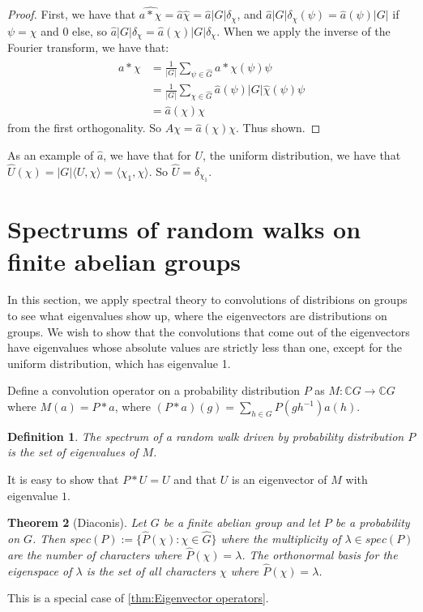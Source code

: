\documentclass[]{article}
\newtheorem{theorem}{Theorem}
\newtheorem{definition}[theorem]{Definition}
\theoremstyle{definition}
\numberwithin{theorem}{section}
\numberwithin{equation}{section}
\begin{document}
\begin{proof}
	First, we have that $\widehat{a\ast \chi} = \widehat{a} \widehat{\chi} = \widehat{a} |G| \delta_\chi$, and $\widehat{a} |G| \delta_\chi(\psi) = \widehat{a}(\psi) |G|$ if $\psi = \chi$ and 0 else, so $\widehat{a} |G| \delta_\chi = \widehat{a}(\chi) |G| \delta_\chi$. When we apply the inverse of the Fourier transform, we have that:
	\begin{align*}
		a \ast \chi &= \frac{1}{|G|}\sum_{\psi \in \widehat{G}} \widehat{a \ast \chi}(\psi) \psi\\
		&=
		\frac{1}{|G|}\sum_{\chi \in \widehat{G}} \widehat{a}(\psi) |G| \widehat{\chi}(\psi) \psi\\
		&= \widehat{a}(\chi) \chi
	\end{align*}
	from the first orthogonality. So $A \chi = \widehat{a}(\chi) \chi$. Thus shown. 
\end{proof}

As an example of $\widehat{a}$, we have that for $U$, the uniform distribution, we have that $\widehat{U}(\chi) = |G|\langle U, \chi \rangle = \langle \chi_1, \chi \rangle $. So $\widehat{U} = \delta_{\chi_1}$. 

\section{Spectrums of random walks on finite abelian groups}\label{sec:spectral theory}
In this section, we apply spectral theory to convolutions of distribions on groups to see what eigenvalues show up, where the eigenvectors are distributions on groups. We wish to show that the convolutions that come out of the eigenvectors have eigenvalues whose absolute values are strictly less than one, except for the uniform distribution, which has eigenvalue 1.

Define a convolution operator on a probability distribution $P$ as $M : \mathbb{C}G \rightarrow \mathbb{C}G$ where $M(a) = P \ast a$, where $(P \ast a) (g) =\sum_{h\in G} P(gh^{-1})a(h)$.
\begin{definition}
	The spectrum of a random walk driven by probability distribution $P$ is the set of eigenvalues of $M$. 
\end{definition} 
It is easy to show that $P \ast U = U$ and that $U$ is an eigenvector of $M$ with eigenvalue $1$. 


\begin{theorem}[Diaconis]
	\label{thm:Diaconis}
	Let $G$ be a finite abelian group and let $P$ be a probability on $G$. Then $spec(P) := \lbrace \widehat{P}(\chi) : \chi \in \widehat{G} \rbrace$ where the multiplicity of $\lambda \in spec(P)$ are the number of characters where $\widehat{P}(\chi) = \lambda$. The orthonormal basis for the eigenspace of $\lambda$ is the set of all characters $\chi$ where $\widehat{P}(\chi) = \lambda$. 
\end{theorem}
This is a special case of \cref{thm:Eigenvector operators}.
\end{document}
